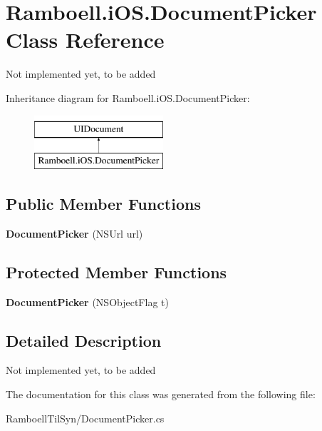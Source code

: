 \hypertarget{class_ramboell_1_1i_o_s_1_1_document_picker}{}\section{Ramboell.\+i\+O\+S.\+Document\+Picker Class Reference}
\label{class_ramboell_1_1i_o_s_1_1_document_picker}


Not implemented yet, to be added  


Inheritance diagram for Ramboell.\+i\+O\+S.\+Document\+Picker\+:\begin{figure}[H]
\begin{center}
\leavevmode
\includegraphics[height=2.000000cm]{class_ramboell_1_1i_o_s_1_1_document_picker}
\end{center}
\end{figure}
\subsection*{Public Member Functions}
\begin{DoxyCompactItemize}
\item 
\mbox{\label{class_ramboell_1_1i_o_s_1_1_document_picker_acb7daeca0628af8cf6d9b4d52ae9adbb}} 
{\bfseries Document\+Picker} (N\+S\+Url url)
\end{DoxyCompactItemize}
\subsection*{Protected Member Functions}
\begin{DoxyCompactItemize}
\item 
\mbox{\label{class_ramboell_1_1i_o_s_1_1_document_picker_a18b38376b5a7fa094463f62b801ac9b3}} 
{\bfseries Document\+Picker} (N\+S\+Object\+Flag t)
\end{DoxyCompactItemize}


\subsection{Detailed Description}
Not implemented yet, to be added 



The documentation for this class was generated from the following file\+:\begin{DoxyCompactItemize}
\item 
Ramboell\+Til\+Syn/Document\+Picker.\+cs\end{DoxyCompactItemize}
